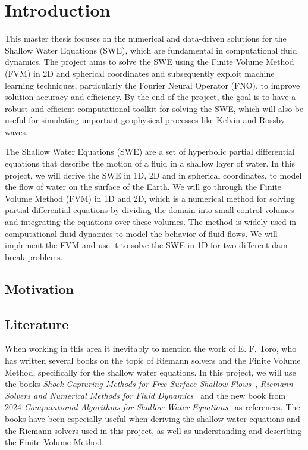 \chapter{Introduction}

This master thesis focuses on the numerical and data-driven solutions for the Shallow Water Equations (SWE), which are fundamental in computational fluid dynamics.
The project aims to solve the SWE using the Finite Volume Method (FVM) in 2D and spherical coordinates and subsequently exploit machine learning techniques, particularly the Fourier Neural Operator (FNO), to improve solution accuracy and efficiency.
By the end of the project, the goal is to have a robust and efficient computational toolkit for solving the SWE, which will also be useful for simulating important geophysical processes like Kelvin and Rossby waves. 

The Shallow Water Equations (SWE) are a set of hyperbolic partial differential equations that describe the motion of a fluid in a shallow layer of water.
In this project, we will derive the SWE in 1D, 2D and in spherical coordinates, to model the flow of water on the surface of the Earth.
We will go through the Finite Volume Method (FVM) in 1D and 2D, which is a numerical method for solving partial differential equations by dividing the domain into small control volumes and integrating the equations over these volumes.
The method is widely used in computational fluid dynamics to model the behavior of fluid flows.
We will implement the FVM and use it to solve the SWE in 1D for two different dam break problems. 


\section{Motivation}

\section{Literature}
When working in this area it inevitably to mention the work of E. F. Toro, who has written several books on the topic of Riemann solvers and the Finite Volume Method, specifically for the shallow water equations.
In this project, we will use the books \textit{Shock-Capturing Methods for Free-Surface Shallow Flows}~\cite{Toro2001-Shock}, \textit{Riemann Solvers and Numerical Methods for Fluid Dynamics}~\cite{Toro2009-Riemann} and the new book from 2024 \textit{Computational Algorithms for Shallow Water Equations}~\cite{Toro2024} as references.
The books have been especially useful when deriving the shallow water equations and the Riemann solvers used in this project, as well as understanding and describing the Finite Volume Method.

